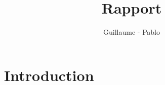 \documentclass{report}
\begin{document}
\title{Rapport}
\author{Guillaume  - Pablo }
\maketitle

\section{Introduction}
\end{document}
